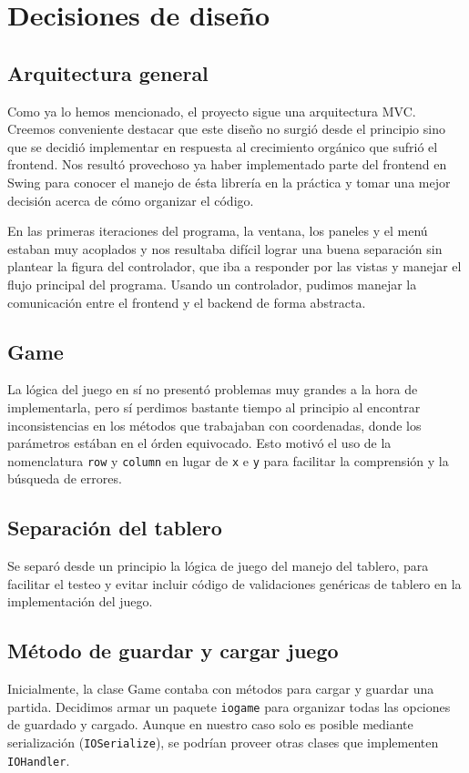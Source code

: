 \documentclass[a4paper, 11pt]{article}
\begin{document}
\section{Decisiones de diseño} 

	\subsection{Arquitectura general}
	Como ya lo hemos mencionado, el proyecto sigue una arquitectura MVC. Creemos conveniente destacar que este diseño no surgió desde el principio sino que se decidió implementar en respuesta al crecimiento orgánico que sufrió el frontend. Nos resultó provechoso ya haber implementado parte del frontend en Swing para conocer el manejo de ésta librería en la práctica y tomar una mejor decisión acerca de cómo organizar el código.

	En las primeras iteraciones del programa, la ventana, los paneles y el menú estaban muy acoplados y nos resultaba difícil lograr una buena separación sin plantear la figura del controlador, que iba a responder por las vistas y manejar el flujo principal del programa. Usando un controlador, pudimos manejar la comunicación entre el frontend y el backend de forma abstracta.
	
	\subsection{Game}
	La lógica del juego en sí no presentó problemas muy grandes a la hora de implementarla, pero sí perdimos bastante tiempo al principio al encontrar inconsistencias en los métodos que trabajaban con coordenadas, donde los parámetros estában en el órden equivocado. Esto motivó el uso de la nomenclatura \texttt{row} y \texttt{column} en lugar de \texttt{x} e \texttt{y} para facilitar la comprensión y la búsqueda de errores. 

	\subsection{Separación del tablero}
	Se separó desde un principio la lógica de juego del manejo del tablero, para facilitar el testeo y evitar incluir código de validaciones genéricas de tablero en la implementación del juego.

	\subsection{Método de guardar y cargar juego}
	Inicialmente, la clase Game contaba con métodos para cargar y guardar una partida. Decidimos armar un paquete \texttt{iogame} para organizar todas las opciones de guardado y cargado. Aunque en nuestro caso solo es posible mediante serialización (\texttt{IOSerialize}), se podrían proveer otras clases que implementen \texttt{IOHandler}.
\end{document}
